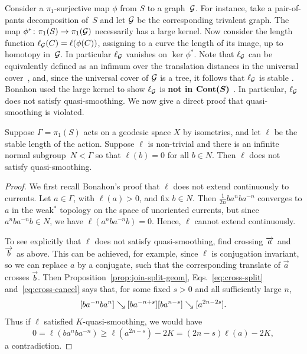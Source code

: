 \begin{example}
  \label{examp:quotient-graph}
  Consider a $\pi_1$-surjective map $\phi$ from $S$ to  a graph~$\mathcal{G}$. For instance, take a pair-of-pants decomposition of~$S$ and let $\mathcal{G}$ be the corresponding trivalent graph. The map $\phi^* \colon \pi_1(S) \to \pi_1(\mathcal{G})$ necessarily has a large kernel. Now consider the length function $\ell_{\mathcal{G}}(C) = \ell(\phi(C))$, assigning to a curve the length of its image, up to homotopy in~$\mathcal{G}$. In particular $\ell_{\mathcal{G}}$ vanishes on $\ker \phi^*$. Note that $\ell_{\mathcal{G}}$ can be equivalently defined as an infimum over the translation distances in the universal cover~\cite[Exercise~8.3.13]{BBI01:MetricGeometry}, and, since the universal cover of $\mathcal{G}$ is a tree, it follows that $\ell_{\mathcal{G}}$ is stable \cite[Section~2.6]{Gromov1981HyperbolicManifolds}. Bonahon used the large kernel to show $\ell_{\mathcal{G}}$ is \textbf{not in $\bm{\mathrm{Cont}(S)}$} \cite[Proposition~11]{Bonahon91:CurrentsGroups}. In particular, $\ell_{\mathcal{G}}$ does not satisfy quasi-smoothing. We now give a direct proof that quasi-smoothing is violated.
\end{example}

\begin{proposition}
Suppose $\Gamma=\pi_1(S)$ acts on a geodesic space $X$ by isometries, and
let $\ell$ be the stable length of the action. Suppose $\ell$ is
non-trivial and there is an infinite normal subgroup~$N < \Gamma$ so
that $\ell(b)=0$ for all $b \in N$. Then $\ell$ does not satisfy
quasi-smoothing.
\label{prop:graph_collapse}
\end{proposition}
\begin{proof}
  We first recall Bonahon's proof that $\ell$ does not extend continuously to currents. Let $a \in \Gamma$, with $\ell(a)>0$, and fix $b\in N$. Then $\frac{1}{2n} b a^n b a^{-n}$ converges to $a$ in the weak$^*$ topology on the space of unoriented currents, but since $a^n b a^{-n} b\in N$, we have $\ell(a^n b a^{-n} b)=0$. Hence, $\ell$ cannot extend continuously.

  To see explicitly that
$\ell$ does not satisfy quasi-smoothing, find crossing
$\overrightarrow{a}$ and $\overrightarrow{b}$ as above. This can be achieved, for example, since $\ell$ is conjugation invariant, so we can replace $a$ by a conjugate, such that the corresponding translate of $\vec a$ crosses $\vec b$.
Then Proposition~\ref{prop:join-split-geom},
Eqs.~\eqref{eq:cross-split} and~\eqref{eq:cross-cancel} says that, for
some fixed $s > 0$ and all sufficiently large $n$,
\[
  [b a^{-n} b a^n] \mathrel{\searrow} [b a^{-n+s}][b a^{n-s}] \mathrel{\searrow}
     [a^{2n - 2s}].
\]
Thus if $\ell$ satisfied $K$-quasi-smoothing, we would have
\[
0 = \ell(ba^n ba^{-n}) \geq \ell(a^{2n-s})-2K = (2n-s)\ell(a)-2K,
\]
a contradiction.
\end{proof}

